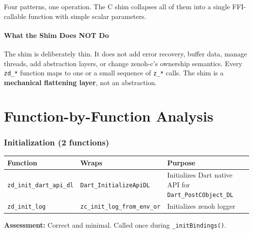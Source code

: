 \documentclass[11pt,a4paper]{article}
\newcommand{\code}[1]{\texttt{#1}}
\newcommand{\fn}[1]{\texttt{#1}}
\begin{document}
\begin{patternbox}
Four patterns, one operation. The C shim collapses all of them into a single
FFI-callable function with simple scalar parameters.
\end{patternbox}


\subsection{What the Shim Does NOT Do}

The shim is deliberately thin. It does not add error recovery, buffer data,
manage threads, add abstraction layers, or change zenoh-c's ownership
semantics. Every \code{zd\_*} function maps to one or a small sequence of
\code{z\_*} calls. The shim is a \textbf{mechanical flattening layer}, not
an abstraction.


\clearpage
\part{Function-by-Function Analysis}
\label{part:functions}

\section{Initialization (2 functions)}

\begin{table}[ht]
\centering\small
\begin{tabularx}{\textwidth}{llL}
  \toprule
  \textbf{Function} & \textbf{Wraps} & \textbf{Purpose} \\
  \midrule
  \fn{zd\_init\_dart\_api\_dl} & \fn{Dart\_InitializeApiDL} & Initializes Dart native API for \fn{Dart\_PostCObject\_DL} \\
  \fn{zd\_init\_log} & \fn{zc\_init\_log\_from\_env\_or} & Initializes zenoh logger \\
  \bottomrule
\end{tabularx}
\end{table}

\textbf{Assessment:} Correct and minimal. Called once during
\fn{\_initBindings()}.


\end{document}
